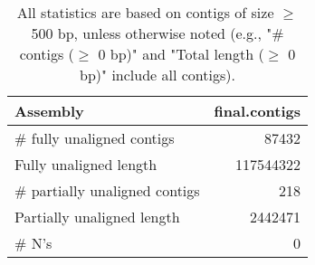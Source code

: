 \documentclass[12pt,a4paper]{article}
\begin{document}
\begin{table}[ht]
\begin{center}
\caption{All statistics are based on contigs of size $\geq$ 500 bp, unless otherwise noted (e.g., "\# contigs ($\geq$ 0 bp)" and "Total length ($\geq$ 0 bp)" include all contigs).}
\begin{tabular}{|l*{1}{|r}|}
\hline
Assembly & final.contigs \\ \hline
\# fully unaligned contigs & 87432 \\ \hline
Fully unaligned length & 117544322 \\ \hline
\# partially unaligned contigs & 218 \\ \hline
Partially unaligned length & 2442471 \\ \hline
\# N's & 0 \\ \hline
\end{tabular}
\end{center}
\end{table}
\end{document}
